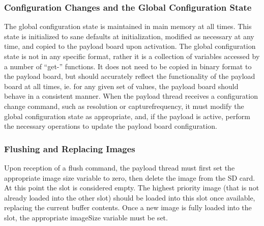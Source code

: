 \documentclass[10pt]{extarticle}
\begin{document}
\subsubsection{Configuration Changes and the Global Configuration State}
The global configuration state is maintained in main memory at all times. 
This state is initialized to sane
defaults at initialization, modified as necessary at any time, and copied
to the payload board upon activation. 
The global configuration state is not in any specific format, rather it is
a collection of variables accessed by a number of ``get-'' functions. It does
not need to be copied in binary format to the payload board, but should
accurately reflect the functionality of the payload board at all times, ie. for
any given set of values, the payload board should behave in a consistent manner.
When the payload thread receives a configuration change command, such as resolution
or capturefrequency, it must modify the global configuration state as
appropriate, and, if the payload is active, perform the necessary operations
to update the payload board configuration.

\subsubsection{Flushing and Replacing Images}
Upon reception of a flush command, the payload thread must first set the
appropriate image size variable to zero, then delete the image
from the SD card. At this point the slot is
considered empty. The highest priority image (that is not already loaded into
the other slot) should be loaded into this slot
once available, replacing the current buffer contents. Once a new image is fully
loaded into the slot, the appropriate imageSize variable must be set.
\end{document}
